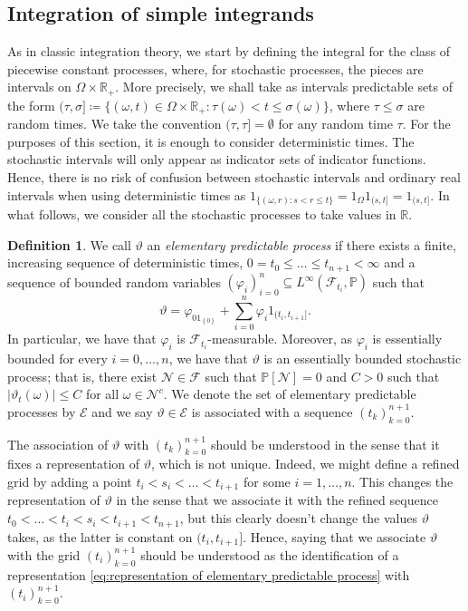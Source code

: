 \documentclass[11pt,a4paper,twoside,openany]{report}
\numberwithin{equation}{section}
\theoremstyle{plain} %
\theoremstyle{definition} %
\newtheorem{definition}[theorem]{Definition}
\theoremstyle{remark} %
\begin{document}
\subsection{Integration of simple integrands}
As in classic integration theory, we start by defining the integral for the class of piecewise constant processes, where, for stochastic processes, the pieces are intervals on \(\Omega\times\mathbb{R}_+\). More precisely, we shall take as intervals predictable sets of the form \((\tau,\sigma]\coloneqq \{(\omega,t)\in\Omega\times\mathbb{R}_+:\tau(\omega)< t\leq\sigma(\omega)\}\), where \(\tau\leq\sigma\) are random times. We take the convention \((\tau,\tau]=\emptyset\) for any random time \(\tau\). For the purposes of this section, it is enough to consider deterministic times. The stochastic intervals will only appear as indicator sets of indicator functions. Hence, there is no risk of confusion between stochastic intervals and ordinary real intervals when using deterministic times as \(1_{\{(\omega,r):s<r\leq t\}}=1_{\Omega}1_{(s,t]}=1_{(s,t]}\). In what follows, we consider all the stochastic processes to take values in \(\mathbb{R}\).

\begin{definition}\label{def:elementary predictable process}
    We call \(\vartheta\) an \textit{elementary predictable process} if there exists a finite, increasing sequence of deterministic times, \(0=t_0\leq\dots\leq t_{n+1}<\infty\) and a sequence of bounded random variables \((\varphi_i)_{i=0}^n\subseteq L^{\infty}(\mathcal{F}_{t_i},\mathbb{P})\) such that 
    \begin{equation}\label{eq:representation of elementary predictable process}
        \vartheta = \varphi_01_{\left\{0\right\}}+\sum_{i=0}^n\varphi_i1_{(t_i,t_{i+1}]}.
    \end{equation}
In particular, we have that \(\varphi_i\) is \(\mathcal{F}_{t_i}\)-measurable. Moreover, as \(\varphi_i\) is essentially bounded for every \(i=0,\dots,n\), we have that \(\vartheta\) is an essentially bounded stochastic process; that is, there exist \(\mathcal{N}\in\mathcal{F}\) such that \(\mathbb{P}[\mathcal{N}]=0\) and \(C>0\) such that \(|\vartheta_t(\omega)|\leq C\) for all \(\omega\in \mathcal{N}^c\).  We denote the set of elementary predictable processes by \(\mathcal{E}\) and we say \(\vartheta\in\mathcal{E}\) is associated with a sequence \((t_k)_{k=0}^{n+1}\).
\end{definition}
The association of \(\vartheta\) with \((t_k)_{k=0}^{n+1}\) should be understood in the sense that it fixes a representation of \(\vartheta\), which is not unique. Indeed, we might define a refined grid by adding a point \(t_i<s_i<\dots<t_{i+1}\) for some \(i=1,\dots,n\). This changes the representation of \(\vartheta\) in the sense that we associate it with the refined sequence \(t_0<\dots<t_i<s_i<t_{i+1}<t_{n+1}\), but this clearly doesn't change the values \(\vartheta\) takes, as the latter is constant on \((t_i,t_{i+1}]\). Hence, saying that we associate \(\vartheta\) with the grid \((t_i)_{k=0}^{n+1}\) should be understood as the identification of a representation \eqref{eq:representation of elementary predictable process} with \((t_i)_{k=0}^{n+1}\).
\end{document}
